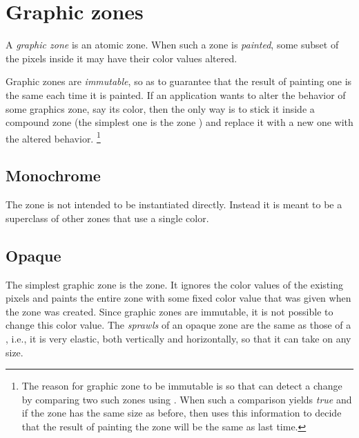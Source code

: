 \section{Graphic zones}
\label{sec-zones-graphic}

A \emph{graphic zone} is an atomic zone.  When such a zone is
\emph{painted}, some subset of the pixels inside it may have their
color values altered.

Graphic zones are \emph{immutable}, so as to guarantee that the result
of painting one is the same each time it is painted.  If an
application wants to alter the behavior of some graphics zone, say its
color, then the only way is to stick it inside a compound zone (the
simplest one is the  zone )
and replace it with a new one with the altered behavior.%
\footnote{The reason for graphic zone to be immutable is so that
  \clim{} can detect a change by comparing two such zones using
  .  When such a comparison yields \emph{true} and if the
  zone has the same size as before, then \clim{} uses this information
  to decide that the result of painting the zone will be the same as
  last time.}

\subsection{Monochrome}
\label{sec-zones-graphic-monocrome}

The  zone is not intended to be instantiated
directly.  Instead it is meant to be a superclass of other zones that
use a single color.  



\subsection{Opaque}
\label{sec-zones-graphic-opaque}

The simplest graphic zone is the  zone.  It ignores the
color values of the existing pixels and paints the entire zone with
some fixed color value that was given when the zone was created.
Since graphic zones are immutable, it is not possible to change this
color value.  The \emph{sprawls} of an opaque zone are the same as
those of a  , i.e., it is
very elastic, both vertically and horizontally, so that it can take on
any size.


